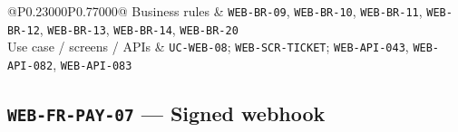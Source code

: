 \begin{longtable}{@{}P{0.23000\SRSWidth}P{0.77000\SRSWidth}@{}}
Business rules & \texttt{WEB-\allowbreak{}BR-\allowbreak{}09}, \texttt{WEB-\allowbreak{}BR-\allowbreak{}10}, \texttt{WEB-\allowbreak{}BR-\allowbreak{}11}, \texttt{WEB-\allowbreak{}BR-\allowbreak{}12}, \texttt{WEB-\allowbreak{}BR-\allowbreak{}13}, \texttt{WEB-\allowbreak{}BR-\allowbreak{}14}, \texttt{WEB-\allowbreak{}BR-\allowbreak{}20} \\[3pt]
Use case /\allowbreak{} screens /\allowbreak{} APIs & \texttt{UC-\allowbreak{}WEB-\allowbreak{}08}; \texttt{WEB-\allowbreak{}SCR-\allowbreak{}TICKET}; \texttt{WEB-\allowbreak{}API-\allowbreak{}043}, \texttt{WEB-\allowbreak{}API-\allowbreak{}082}, \texttt{WEB-\allowbreak{}API-\allowbreak{}083} \\[3pt]
\end{longtable}
\endgroup

\subsection{\texttt{WEB-\allowbreak{}FR-\allowbreak{}PAY-\allowbreak{}07} — Signed webhook}
\begingroup
\fontsize{9.5}{12}\selectfont
\setlength{\SRSWidth}{\dimexpr\linewidth-2\tabcolsep\relax}

